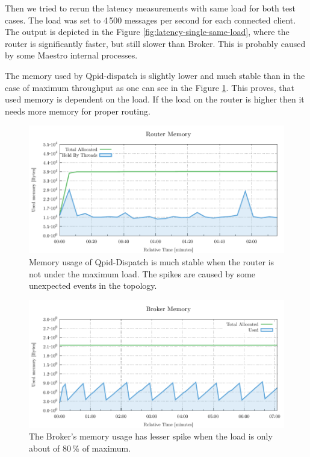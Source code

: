 Then we tried to rerun the latency measurements with same load for both test cases. The load was set to 4\,500 messages per second for each connected client. The output is depicted in the Figure \ref{fig:latency-single-same-load}, where the router is significantly faster, but still slower than Broker. This is probably caused by some Maestro internal processes.

The memory used by Qpid-dispatch is slightly lower and much stable than in the case of maximum throughput as one can see in the Figure \ref{fig:latency-single-router-memory}. This proves, that used memory is dependent on the load. If the load on the router is higher then it needs more memory for proper routing.

\begin{figure}[H]
	\centering
	\includegraphics[width=1\linewidth]{obrazky-figures/charts/singlepoint-router-latency-memory.pdf}
	\caption{Memory usage of Qpid-Dispatch is much stable when the router is not under the maximum load. The spikes are caused by some unexpected events in the topology.}
	\label{fig:latency-single-router-memory}
\end{figure}


\begin{figure}[H]
	\centering
	\includegraphics[width=1\linewidth]{obrazky-figures/charts/singlepoint-broker-latency-memory.pdf}
	\caption{The Broker's memory usage has lesser spike when the load is only about of 80\,\% of maximum.}
	\label{fig:latency-single-broker-memory}
\end{figure}


